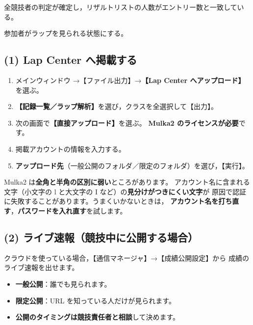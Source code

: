 \begin{Done}
全競技者の判定が確定し，リザルトリストの人数がエントリー数と一致している。
\end{Done}


\begin{Goal}
参加者がラップを見られる状態にする。
\end{Goal}

\subsection*{(1) Lap Center へ掲載する}

\begin{enumerate}
\item メインウィンドウ →【ファイル出力】→\textbf{【Lap Center へアップロード】}を選ぶ。\ver
\item \textbf{【記録一覧／ラップ解析】}を選び，クラスを全選択して【出力】。
\item 次の画面で\textbf{【直接アップロード】}を選ぶ。
      \textbf{Mulka2 のライセンスが必要}です。
\item 掲載アカウントの情報を入力する。
\item \textbf{アップロード先}（一般公開のフォルダ／限定のフォルダ）を選び，【実行】。
\end{enumerate}

\begin{Note}[アップロードできないとき]
Mulka2 は\textbf{全角と半角の区別に弱い}ところがあります。
アカウント名に含まれる文字（小文字の l と大文字の I など）の\textbf{見分けがつきにくい文字}が
原因で認証に失敗することがあります。うまくいかないときは，
\textbf{アカウント名を打ち直す}，\textbf{パスワードを入れ直す}を試します。
\end{Note}

\subsection*{(2) ライブ速報（競技中に公開する場合）}

クラウドを使っている場合，【通信マネージャ】→【成績公開設定】から
成績のライブ速報を出せます。\ver

\begin{itemize}
\item \textbf{一般公開}：誰でも見られます。
\item \textbf{限定公開}：URL を知っている人だけが見られます。
\item \textbf{公開のタイミングは競技責任者と相談}して決めます。
\end{itemize}

